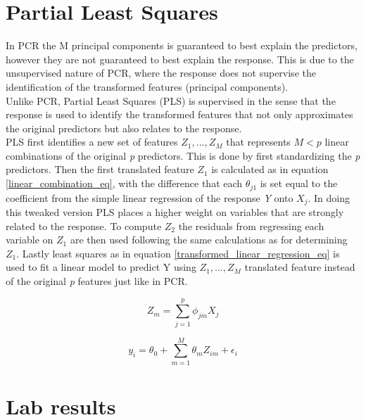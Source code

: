 \section{Partial Least Squares}
In PCR the M principal components is guaranteed to best explain the predictors, however they are not guaranteed to best explain the response. This is due to the unsupervised nature of PCR, where the response does not supervise the identification of the transformed features (principal components).\\
Unlike PCR, Partial Least Squares (PLS) is supervised in the sense that the response is used to identify the transformed features that not only approximates the original predictors but also relates to the response.\\
PLS first identifies a new set of features \(Z_1,...,Z_M\) that represents \(M < p\) linear combinations of the original \emph{p} predictors. This is done by first standardizing the \emph{p} predictors. Then the first translated feature \(Z_1\) is calculated as in equation \ref{linear_combination_eq}, with the difference that each \(\theta_{j1}\) is set equal to the coefficient from the simple linear regression of the response \emph{Y} onto \(X_j\). In doing this tweaked version PLS places a higher weight on variables that are strongly related to the response. To compute \(Z_2\) the residuals from regressing each variable on \(Z_1\) are then used following the same calculations as for determining \(Z_1\). Lastly least squares as in equation \ref{transformed_linear_regression_eq} is used to fit a linear model to predict Y using \(Z_1,...,Z_M\) translated feature instead of the original \emph{p} features just like in PCR.

\begin{equation}
Z_m = \sum_{j=1}^{p}\phi_{jm}X_j\label{linear_combination_eq}
\end{equation}

\begin{equation}
y_i = \theta_0 + \sum_{m=1}^{M}\theta_{m}Z_{im} + \epsilon_i\label{transformed_linear_regression_eq}
\end{equation}

\section{Lab results}

